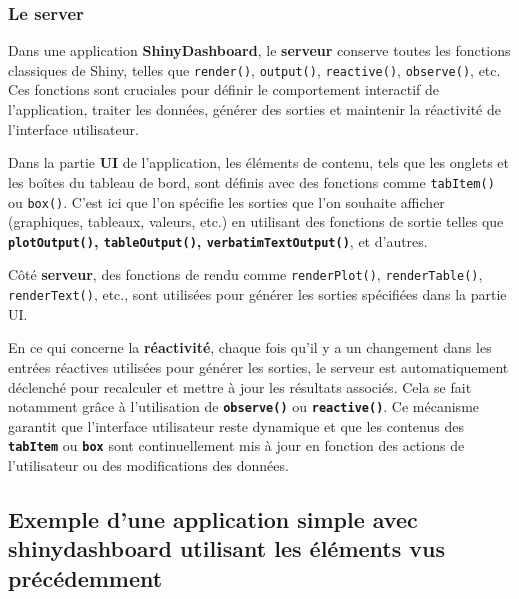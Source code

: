 \documentclass[
]{article}
\makeatletter
\newcommand*\pandocbounded[1]{%
  \sbox\pandoc@box{#1}%
  \Gscale@div\@tempa{\textheight}{\dimexpr\ht\pandoc@box+\dp\pandoc@box\relax}%
  \Gscale@div\@tempb{\linewidth}{\wd\pandoc@box}%
  \ifdim\@tempb\p@<\@tempa\p@\let\@tempa\@tempb\fi%
  \ifdim\@tempa\p@<\p@\scalebox{\@tempa}{\usebox\pandoc@box}%
  \else\usebox{\pandoc@box}%
  \fi%
}
\makeatother
\begin{document}
\pandocbounded{\texttt{[image: ../images/corps\_dash.png]}}

\subsubsection{Le server}\label{le-server}

Dans une application \textbf{ShinyDashboard}, le \textbf{serveur}
conserve toutes les fonctions classiques de Shiny, telles que
\texttt{render()}, \texttt{output()}, \texttt{reactive()},
\texttt{observe()}, etc. Ces fonctions sont cruciales pour définir le
comportement interactif de l'application, traiter les données, générer
des sorties et maintenir la réactivité de l'interface utilisateur.

Dans la partie \textbf{UI} de l'application, les éléments de contenu,
tels que les onglets et les boîtes du tableau de bord, sont définis avec
des fonctions comme \texttt{tabItem()} ou \texttt{box()}. C'est ici que
l'on spécifie les sorties que l'on souhaite afficher (graphiques,
tableaux, valeurs, etc.) en utilisant des fonctions de sortie telles que
\textbf{\texttt{plotOutput()}, \texttt{tableOutput()},
\texttt{verbatimTextOutput()}}, et d'autres.

Côté \textbf{serveur}, des fonctions de rendu comme
\texttt{renderPlot()}, \texttt{renderTable()}, \texttt{renderText()},
etc., sont utilisées pour générer les sorties spécifiées dans la partie
UI.

En ce qui concerne la \textbf{réactivité}, chaque fois qu'il y a un
changement dans les entrées réactives utilisées pour générer les
sorties, le serveur est automatiquement déclenché pour recalculer et
mettre à jour les résultats associés. Cela se fait notamment grâce à
l'utilisation de \textbf{\texttt{observe()}} ou
\textbf{\texttt{reactive()}}. Ce mécanisme garantit que l'interface
utilisateur reste dynamique et que les contenus des
\textbf{\texttt{tabItem}} ou \textbf{\texttt{box}} sont continuellement
mis à jour en fonction des actions de l'utilisateur ou des modifications
des données.

\subsection{Exemple d'une application simple avec shinydashboard
utilisant les éléments vus
précédemment}\label{exemple-dune-application-simple-avec-shinydashboard-utilisant-les-uxe9luxe9ments-vus-pruxe9cuxe9demment}
\end{document}
